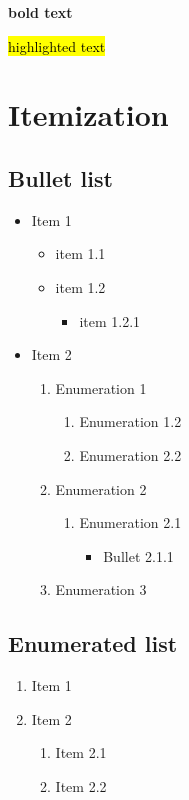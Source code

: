\documentclass{extarticle}
\begin{document}
\textbf{bold text}

\hl{highlighted text}





\section{Itemization}

\subsection{Bullet list}

\begin{itemize}
\item Item 1
\begin{itemize}
\item item 1.1
\item item 1.2
\begin{itemize}
\item item 1.2.1
\end{itemize}
\end{itemize}
\item Item 2
\begin{enumerate}
\item Enumeration 1
\begin{enumerate}
\item Enumeration 1.2
\item Enumeration 2.2
\end{enumerate}
\item Enumeration 2
\begin{enumerate}
\item Enumeration 2.1
\begin{itemize}
\item Bullet 2.1.1
\end{itemize}
\end{enumerate}
\item Enumeration 3
\end{enumerate}
\end{itemize}


\subsection{Enumerated list}

\begin{enumerate}
\item Item 1
\item Item 2
\begin{enumerate}
\item Item 2.1
\item Item 2.2
\end{enumerate}
\end{enumerate}
\end{document}
